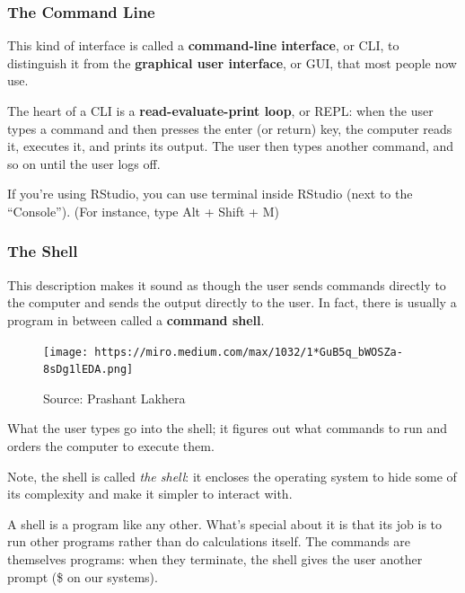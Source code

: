 \documentclass[
  letterpaper,
  DIV=11,
  numbers=noendperiod]{scrreprt}
\begin{document}
\hypertarget{the-command-line-1}{%
\subsubsection*{The Command Line}\label{the-command-line-1}}

This kind of interface is called a \textbf{command-line interface}, or
CLI, to distinguish it from the \textbf{graphical user interface}, or
GUI, that most people now use.

The heart of a CLI is a \textbf{read-evaluate-print loop}, or REPL: when
the user types a command and then presses the enter (or return) key, the
computer reads it, executes it, and prints its output. The user then
types another command, and so on until the user logs off.

If you're using RStudio, you can use terminal inside RStudio (next to
the ``Console''). (For instance, type Alt + Shift + M)

\hypertarget{the-shell}{%
\subsubsection*{The Shell}\label{the-shell}}

This description makes it sound as though the user sends commands
directly to the computer and sends the output directly to the user. In
fact, there is usually a program in between called a \textbf{command
shell}.

\begin{figure}

{\centering \texttt{[image: https://miro.medium.com/max/1032/1*GuB5q\_bWOSZa-8sDg1lEDA.png]}

}

\caption{Source: Prashant Lakhera}

\end{figure}

What the user types go into the shell; it figures out what commands to
run and orders the computer to execute them.

Note, the shell is called \emph{the shell}: it encloses the operating
system to hide some of its complexity and make it simpler to interact
with.

A shell is a program like any other. What's special about it is that its
job is to run other programs rather than do calculations itself. The
commands are themselves programs: when they terminate, the shell gives
the user another prompt (\$ on our systems).
\end{document}
